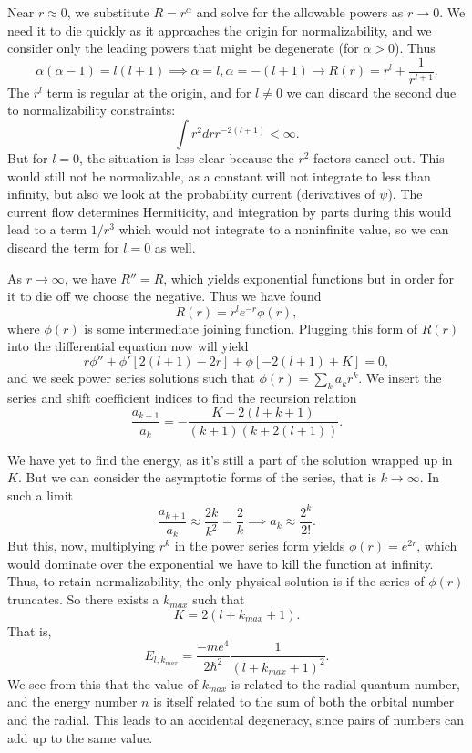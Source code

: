 \documentclass[fontsize=12pt]{scrartcl}
\begin{document}
Near $r\approx 0$, we substitute $R=r^{\alpha}$ and solve for the allowable powers as $r\to 0$. We need it to die quickly as it approaches the origin for normalizability, and we consider only the leading powers that might be degenerate (for $\alpha>0$). Thus $$\alpha(\alpha-1)=l(l+1)\implies \alpha=l, \alpha=-(l+1)\to R(r)=r^l+\frac{1}{r^{l+1}}.$$ The $r^l$ term is regular at the origin, and for $l\neq 0$ we can discard the second due to normalizability constraints: $$\int r^2 dr r^{-2(l+1)}<\infty.$$ But for $l=0$, the situation is less clear because the $r^2$ factors cancel out. This would still not be normalizable, as a constant will not integrate to less than infinity, but also we look at the probability current (derivatives of $\psi$). The current flow determines Hermiticity, and integration by parts during this would lead to a term $1/r^3$ which would not integrate to a noninfinite value, so we can discard the term for $l=0$ as well.

As $r\to\infty$, we have $R''=R$, which yields exponential functions but in order for it to die off we choose the negative. Thus we have found $$R(r)=r^le^{-r}\phi(r),$$ where $\phi(r)$ is some intermediate joining function. Plugging this form of $R(r)$ into the differential equation now will yield $$r\phi'' +\phi'\left[2(l+1)-2r\right]+\phi\left[-2(l+1)+K\right]=0,$$ and we seek power series solutions such that $\phi(r)=\sum_ka_kr^k.$ We insert the series and shift coefficient indices to find the recursion relation $$\frac{a_{k+1}}{a_k}=-\frac{K-2(l+k+1)}{(k+1)(k+2(l+1))}.$$

We have yet to find the energy, as it's still a part of the solution wrapped up in $K$. But we can consider the asymptotic forms of the series, that is $k\to\infty$. In such a limit $$\frac{a_{k+1}}{a_k}\approx \frac{2k}{k^2}=\frac{2}{k}\implies a_k\approx \frac{2^k}{2!}.$$ But this, now, multiplying $r^k$ in the power series form yields $\phi(r)=e^{2r}$, which would dominate over the exponential we have to kill the function at infinity. Thus, to retain normalizability, the only physical solution is if the series of $\phi(r)$ truncates. So there exists a $k_{max}$ such that $$K=2(l+k_{max}+1).$$ That is, $$E_{l,k_{max}}=\frac{-me^4}{2\hbar^2}\frac{1}{(l+k_{max}+1)^2}.$$ We see from this that the value of $k_{max}$ is related to the radial quantum number, and the energy number $n$ is itself related to the sum of both the orbital number and the radial. This leads to an accidental degeneracy, since pairs of numbers can add up to the same value.
\end{document}
